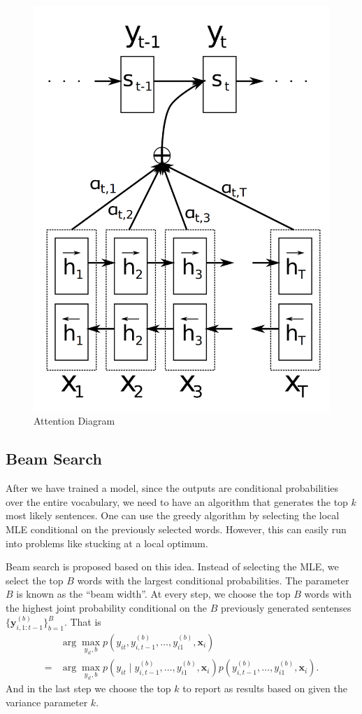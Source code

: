 \documentclass[12pt]{article}
\begin{document}
\begin{figure}
	\centering
	\includegraphics[width=0.4\linewidth]{figs/attn_diagram}
	\caption{Attention Diagram}
	\label{attn_diagram}
\end{figure}


\subsection{Beam Search}
\label{sub:beam}
After we have trained a model, since the outputs are conditional probabilities over the entire vocabulary, we need to have an algorithm that generates the top $k$ most likely sentences. One can use the greedy algorithm by selecting the local MLE conditional on the previously selected words. However, this can easily run into problems like stucking at a local optimum.

Beam search is proposed based on this idea. Instead of selecting the MLE, we select the top $B$ words with the largest conditional probabilities. The parameter $B$ is known as the ``beam width''. At every step, we choose the top $B$ words with the highest joint probability conditional on the $B$ previously generated sentenses $\{\bm y_{i, 1:t-1}^{(b)}\}_{b=1}^B$. That is
\begin{align}
	&\arg \max_{y_{it}, b} p(y_{it}, y_{i,t-1}^{(b)}, \dots, y_{i1}^{(b)}, \bm x_i)\nonumber\\
	=& \arg \max_{y_{it}, b} p(y_{it} \mid y_{i,t-1}^{(b)}, \dots, y_{i1}^{(b)}, \bm x_i) p(y_{i,t-1}^{(b)}, \dots, y_{i1}^{(b)}, \bm x_i).
\end{align}
And in the last step we choose the top $k$ to report as results based on given the variance parameter $k$.
\end{document}
